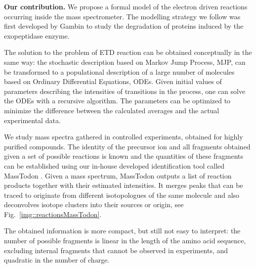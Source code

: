 \documentclass{llncs}
\begin{document}
\textbf{Our contribution.}
        We propose a formal model of the electron driven reactions occurring inside the mass spectrometer. The modelling strategy we follow was first developed by Gambin \cite{Gambin2010} to study the degradation of proteins induced by the exopeptidase enzyme.

        The solution to the problem of ETD reaction can be obtained conceptually in the same way: the stochastic description based on Markov Jump Process, MJP, can be transformed to a populational description of a large number of molecules based on Ordinary Differential Equations, ODEs.
        Given initial values of parameters describing the intensities of transitions in the process, one can solve the ODEs with a recursive algorithm. The parameters can be optimized to minimize the difference between the calculated averages and the actual experimental data.

        We study mass spectra gathered in controlled experiments, obtained for highly purified compounds. The identity of the precursor ion and all fragments obtained given a set of possible reactions is known and the quantities of these fragments can be established using our in-house developed identification tool called MassTodon \cite{Lermyte2015-lm,Lermyte2017-zt}. Given a mass spectrum, MassTodon outputs a list of reaction products together with their estimated intensities. It merges peaks that can be traced to originate from different isotopologues of the same molecule and also deconvolves isotope clusters into their sources or origin, see Fig.~\ref{img::reactionsMassTodon}.

        The obtained information is more compact, but still not easy to interpret: the number of possible fragments is linear in the length of the amino acid sequence, excluding internal fragments that cannot be observed in experiments, and quadratic in the number of charge.
\end{document}
